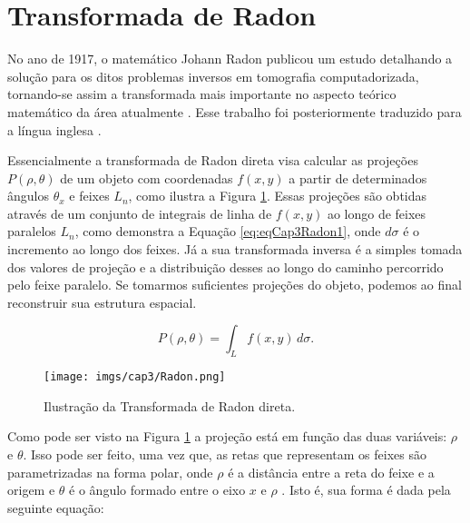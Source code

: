  
\section{Transformada de Radon}\label{TransformadaRadon2D}

No ano de 1917, o matemático Johann Radon publicou um estudo detalhando a solução para os ditos problemas inversos em tomografia computadorizada, tornando-se assim a transformada mais importante no aspecto teórico matemático da área atualmente \cite{radon1917uber}. Esse trabalho foi posteriormente traduzido para a língua inglesa \cite{radon1986determination}.

Essencialmente a transformada de Radon direta visa calcular as projeções $P(\rho,\theta)$ de um objeto com coordenadas $f(x,y)$ a partir de determinados ângulos $\theta_{x}$ e feixes $L_{n}$, como ilustra a Figura \ref{fig:imgCap3Radon}. Essas projeções são obtidas através de um conjunto de integrais de linha de $f(x,y)$ ao longo de feixes paralelos  $L_{n}$, como demonstra a Equação \ref{eq:eqCap3Radon1}, onde $d\sigma$ é o incremento ao longo dos feixes. Já a sua transformada inversa é a simples tomada dos valores de projeção e a distribuição desses ao longo do caminho percorrido pelo feixe paralelo. Se tomarmos suficientes projeções do objeto, podemos ao final reconstruir sua estrutura espacial. 

\begin{equation} 
P(\rho,\theta) = {\int_{L}^{} f(x,y) \, d\sigma}.
\label{eq:eqCap3Radon1}
\end{equation}


\begin{figure}[H]
	\caption{Ilustração da Transformada de Radon direta.}
	\begin{center}
		\texttt{[image: imgs/cap3/Radon.png]}
	\end{center}
	\label{fig:imgCap3Radon}
\end{figure}

Como pode ser visto na Figura \ref{fig:imgCap3Radon} a projeção está em função das duas variáveis: $\rho$ e $\theta$. Isso pode ser feito, uma vez que, as retas que representam os feixes são parametrizadas na forma polar, onde $\rho$ é a distância entre a reta do feixe e a origem e $\theta$ é o ângulo formado entre o eixo $x$ e $\rho$ \cite{yang2012numerical}. Isto é, sua forma é dada pela seguinte equação:

